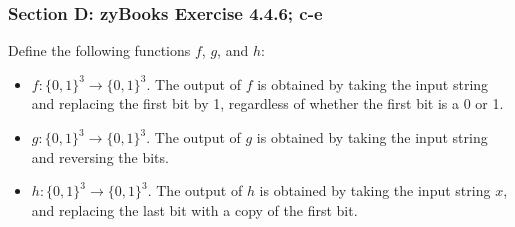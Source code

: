 \documentclass[14pt]{extreport}
\begin{document}
\subsubsection*{Section D: zyBooks Exercise 4.4.6; c-e}

Define the following functions \( f \), \( g \), and \( h \):

\begin{itemize}
    \item \( f: \{0, 1\}^3 \rightarrow \{0, 1\}^3 \). The output of \( f \) is obtained by taking the input string and replacing the first bit by 1, regardless of whether the first bit is a 0 or 1.
    \item \( g: \{0, 1\}^3 \rightarrow \{0, 1\}^3 \). The output of \( g \) is obtained by taking the input string and reversing the bits.
    \item \( h: \{0, 1\}^3 \rightarrow \{0, 1\}^3 \). The output of \( h \) is obtained by taking the input string \( x \), and replacing the last bit with a copy of the first bit.
\end{itemize}
	
\end{document}
